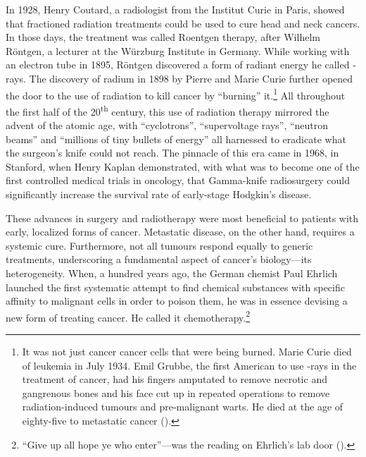 In 1928, Henry Coutard, a radiologist from the Institut Curie in Paris, showed
that fractioned radiation treatments could be used to cure head and neck
cancers.\cite{coutard_roentgen_1932} In those days, the treatment was called
Roentgen therapy, after Wilhelm Röntgen, a lecturer at the Würzburg Institute in
Germany.  While working with an electron tube in 1895, Röntgen discovered a form
of radiant energy he called -rays.  The discovery of radium in 1898
by Pierre and Marie Curie further opened the door to the use of radiation to
kill cancer by ``burning'' it.\footnote{It was not just cancer cancer cells that
  were being burned.  Marie Curie died of leukemia in July 1934.  Emil Grubbe,
  the first American to use -rays in the treatment of cancer, had
  his fingers amputated to remove necrotic and gangrenous bones and his face cut
  up in repeated operations to remove \mbox{radiation-induced} tumours and
  \mbox{pre-malignant} warts. He died at the age of eighty-five to metastatic
  cancer (\citealp{mukherjee_emperor_2011}).}  All throughout the first half of
the 20\textsuperscript{th} century, this use of radiation therapy mirrored the
advent of the atomic age, with ``cyclotrons'', ``supervoltage rays'', ``neutron
beams'' and ``millions of tiny bullets of energy'' all harnessed to eradicate
what the surgeon's knife could not reach.\cite{mukherjee_emperor_2011} The
pinnacle of this era came in 1968, in Stanford, when Henry Kaplan demonstrated,
with what was to become one of the first controlled medical trials in oncology,
that \mbox{Gamma-knife} radiosurgery could significantly increase the survival
rate of early-stage Hodgkin's disease.\cite{kaplan_clinical_1968}

These advances in surgery and radiotherapy were most beneficial to patients with
early, localized forms of cancer.  Metastatic disease, on the other hand,
requires a systemic cure.  Furthermore, not all tumours respond equally to
generic treatments, underscoring a fundamental aspect of cancer's biology---its
heterogeneity.  When, a hundred years ago, the German chemist Paul Ehrlich
launched the first systematic attempt to find chemical substances with specific
affinity to malignant cells in order to poison them, he was in essence devising
a new form of treating cancer. He called it chemotherapy.\footnote{``Give up all
  hope ye who enter''---was the reading on Ehrlich's lab door
  (\citealp{devita_history_2008}).}

